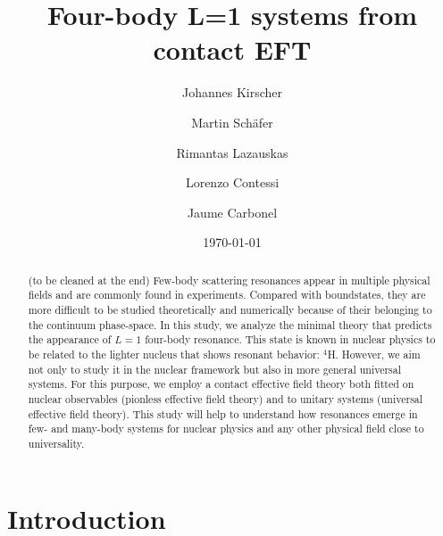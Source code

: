 \documentclass[aps,onecolumn,preprintnumbers,amsmath,amssymb,nofootinbib,superscriptaddress,notitlepage]{revtex4-1}
\begin{document}
\title{Four-body L=1 systems from contact EFT}

\author{Johannes Kirscher}
\address{Theoretical Physics Division, School of Physics and Astronomy,\\
  The University of Manchester, Manchester, M13 9PL, UK}
  
\author{Martin Sch{\"a}fer}
\address{Nuclear Physics Institute of the Czech Academy of Sciences, 25069 \v{R}e\v{z}, Czech Republic}
  
\author{Rimantas Lazauskas}
\address{IPHC, IN2P3-CNRS/Universit\'e de Strasbourg BP 28, F-67037 Strasbourg Cedex 2, France}

\author{Lorenzo Contessi}
\address{IRFU, CEA, Universit\'e Paris-Saclay, 91191 Gif-sur-Yvette, France}

\author{Jaume Carbonel}
\address{Universit\'e Paris-Saclay, CNRS/IN2P3, IJCLab, 91405 Orsay, France} 

\date{\today}




\begin{abstract} 
(to be cleaned at the end)
Few-body scattering resonances appear in multiple physical fields and are commonly found in experiments. 
Compared with boundstates, they are more difficult to be studied theoretically and numerically because of their belonging to the continuum phase-space.
In this study, we analyze the minimal theory that predicts the appearance of $L=1$ four-body resonance.
This state is known in nuclear physics to be related to the lighter nucleus that shows resonant behavior: $^4$H.
However, we aim not only to study it in the nuclear framework but also in more general universal systems.
For this purpose, we employ a contact effective field theory both fitted on nuclear observables (pionless effective field theory) and to unitary systems (universal effective field theory).
This study will help to understand how resonances emerge in few- and many-body systems for nuclear physics and any other physical field close to universality.
\end{abstract}



\maketitle

\section{Introduction}
\end{document}
